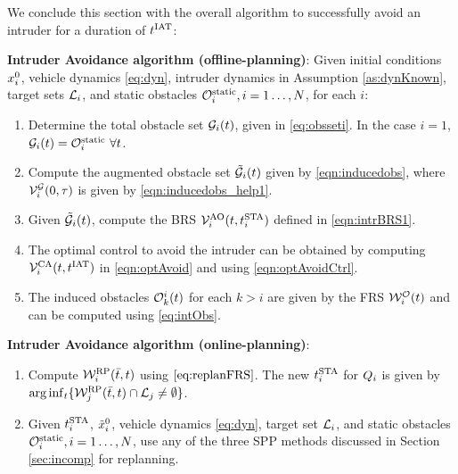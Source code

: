 We conclude this section with the overall algorithm to successfully avoid an intruder for a duration of $t^\text{IAT}$: 
\begin{alg}
\label{alg:intruder}
\textbf{Intruder Avoidance algorithm (offline-planning)}: Given initial conditions $x_i^0$, vehicle dynamics \eqref{eq:dyn}, intruder dynamics in Assumption \ref{as:dynKnown}, target sets $\mathcal{L}_i$, and static obstacles $\mathcal{O}^\text{static}_i, i = 1\ldots, N$, for each $i$:
\begin{enumerate}
\item Determine the total obstacle set $\mathcal{G}_i(t)$, given in \eqref{eq:obsseti}. In the case $i=1$, $\mathcal{G}_i(t) = \mathcal{O}^\text{static}_i ~ \forall t$.
\item Compute the augmented obstacle set $\tilde{\mathcal{G}}_i(t)$ given by \eqref{eqn:inducedobs}, where $\mathcal{V}^{\mathcal{G}}_{i}(0, \tau)$ is given by \eqref{eqn:inducedobs_help1}.
\item Given $\tilde{\mathcal{G}}_i(t)$, compute the BRS $\mathcal{V}^{\text{AO}}_{i}(t, t^\text{STA}_i)$ defined in \eqref{eqn:intrBRS1}.
\item The optimal control to avoid the intruder can be obtained by computing $\mathcal{V}^{\text{CA}}_{i}(t, t^\text{IAT})$ in \eqref{eqn:optAvoid} and using \eqref{eqn:optAvoidCtrl}. 
\item The induced obstacles $\mathcal{O}_k^i(t)$ for each $k>i$ are given by the FRS $\mathcal{W}_{i}^{\mathcal{O}}(t)$ and can be computed using \eqref{eq:intObs}.
\end{enumerate}

\textbf{Intruder Avoidance algorithm (online-planning)}:
\begin{enumerate}
\item Compute $\mathcal{W}_i^{\text{RP}}(\bar{t}, t)$ using $\eqref{eq:replanFRS}$. The new $t^\text{STA}_i$ for $Q_i$ is given by $\arg \inf_t \{ \mathcal{W}_j^{\text{RP}}(\bar{t}, t) \cap \mathcal{L}_j \neq \emptyset \}$.
\item Given $t^\text{STA}_i$, $\tilde{x}_i^0$, vehicle dynamics \eqref{eq:dyn}, target set $\mathcal{L}_i$, and static obstacles $\mathcal{O}^\text{static}_i, i = 1\ldots, N$, use any of the three SPP methods discussed in Section \ref{sec:incomp} for replanning. 
\end{enumerate}
\end{alg}